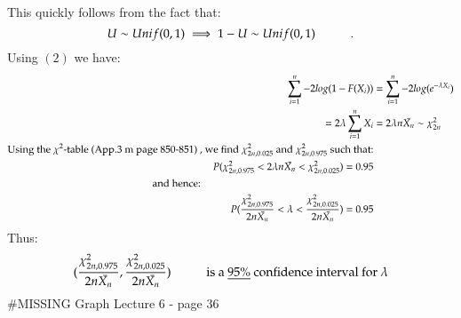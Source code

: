 \documentclass[14pt,twoside,a4paper,fleqn]{article}
\theoremstyle{plain}
\begin{document}
This quickly follows from the fact that:
$$
	U \sim Unif(0,1) \implies 1-U \sim Unif(0,1)\hspace*{1cm} .
$$
Using $(2)$ we have:
\begin{equation*}
\begin{split}
\sum_{i=1}^n -2 log(1-F(X_i)) &= \sum_{i=1}^n -2 log(e^{-\lambda X_i})\\
	= 2\lambda \sum_{i=1}^n X_i &= 2\lambda n \bar{X_n} \sim \chi^2_{2n}\\
	\text{Using the $\chi^2$-table (App.3 m page 850-851) , we find \mbox{$\chi^2_{2n, 0.025}$} and \mbox{$\chi^2_{2n,0.975}$} such that:}\\
	P(\chi^2_{2n,0.975} < 2\lambda n\bar{X_n} < \chi^2_{2n,0.025} ) = 0.95\\
	\text{and hence:}\tab[6cm]\\
	P(\frac{\chi^2_{2n, 0.975}}{2n\bar{X_n}} < \lambda < \frac{\chi^2_{2n,0.025}}{2 n \bar{X_n}}) = 0.95
\end{split}
\end{equation*}
Thus:
$$(\frac{\chi^2_{2n , 0.975}}{2n\bar{X_n}} , \frac{\chi^2_{2n,0.025}}{2n\bar{X_n}})\hspace*{1cm} \text{is a \underline{$95\%$} confidence interval for $\lambda$}
$$
\#MISSING Graph Lecture 6 - page 36
\end{document}
